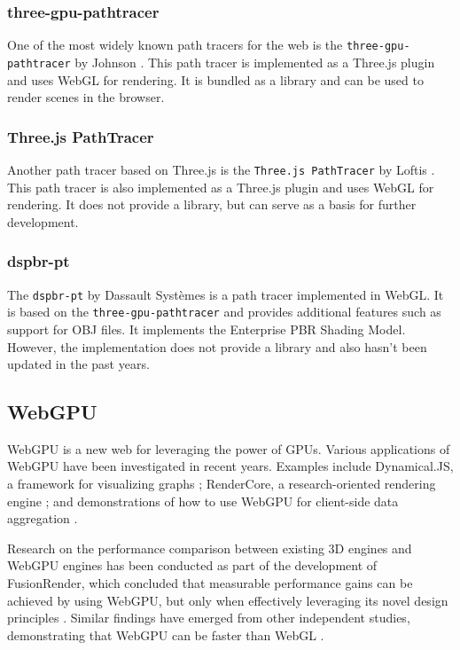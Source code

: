 \subsubsection{three-gpu-pathtracer}

One of the most widely known path tracers for the web is the \texttt{three-gpu-pathtracer} by Johnson \cite{ThreeJsPathTracerJohnson}. This path tracer is implemented as a \gls{Three.js} plugin and uses \gls{WebGL} for rendering.  It is bundled as a library and can be used to render scenes in the browser.

\subsubsection{Three.js PathTracer}

Another path tracer based on \gls{Three.js} is the \texttt{Three.js PathTracer} by Loftis \cite{ThreeJsPathTracerLoftis}. This path tracer is also implemented as a \gls{Three.js} plugin and uses \gls{WebGL} for rendering. It does not provide a library, but can serve as a basis for further development.

\subsubsection{dspbr-pt}

The \texttt{dspbr-pt} by Dassault Systèmes \cite{PathTracerDassault} is a path tracer implemented in \gls{WebGL}. It is based on the \texttt{three-gpu-pathtracer} and provides additional features such as support for \gls{OBJ} files. It implements the Enterprise PBR Shading Model. However, the implementation does not provide a library and also hasn't been updated in the past years.

\subsection*{WebGPU}

WebGPU is a new web  for leveraging the power of \glspl{GPU}. Various applications of WebGPU have been investigated in recent years. Examples include Dynamical.JS, a framework for visualizing graphs \cite{dotson2022dynamicaljs}; RenderCore, a research-oriented rendering engine \cite{Bohak_Kovalskyi_Linev_Mrak_Tadel_Strban_Tadel_Yagil_2024}; and demonstrations of how to use WebGPU for client-side data aggregation \cite{kimmersdorfer2023webgpu}.

Research on the performance comparison between existing 3D engines and WebGPU engines has been conducted as part of the development of FusionRender, which concluded that measurable performance gains can be achieved by using WebGPU, but only when effectively leveraging its novel design principles \cite{fusionRenderWebGPU}. Similar findings have emerged from other independent studies, demonstrating that WebGPU can be faster than \gls{WebGL} \cite{webGPUWebGis, fransson2023performance, CHICKERUR2024919}.

